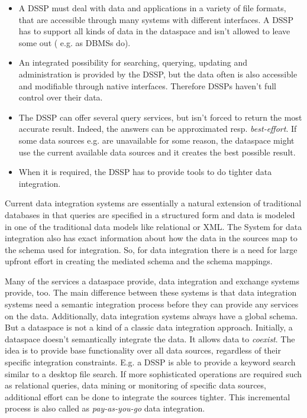 \begin{itemize}
\item A DSSP must deal with data and applications in a variety of file formats, that are accessible through many systems with different interfaces. A DSSP has to support all kinds of data in the dataspace and isn't allowed to leave some out ( e.g. as DBMSs do).

\item An integrated possibility for searching, querying, updating and administration is provided by the DSSP, but the data often is also accessible and modifiable through native interfaces. Therefore DSSPs haven't full control over their data.

\item The DSSP can offer several query services, but isn't forced to return the most accurate result. Indeed,  the answers can be approximated resp. \emph{best-effort}. If some data sources e.g. are unavailable for some reason, the dataspace might use the current available data sources and
it creates the best possible result.

\item When it is required, the DSSP has to provide tools to do tighter data integration.
\end{itemize}

Current data integration systems are essentially a natural extension of traditional databases in that queries are specified in a structured form and data is modeled in one of the traditional data models like relational or XML. The System for data integration also has exact information about how the data in the sources map to the schema used for integration. So, for data integration there is a need for large upfront effort in creating the mediated schema and the schema mappings.

Many of the services a dataspace provide, data integration and exchange systems provide, too. The main difference between these systems is that data integration systems need a semantic integration process before they can provide any services on the data. Additionally, data integration systems always have a global schema. But a dataspace is not a kind of a classic data integration approach. Initially, a dataspace doesn't semantically integrate the data. It allows data to \emph{coexist}.  The idea is to provide base functionality over all data sources, regardless of their specific integration constraints. E.g. a DSSP is able to provide a keyword search similar to a desktop file search. If more sophisticated operations are required such as relational queries, data mining or monitoring of specific data sources, additional effort can be done to integrate the sources tighter. This incremental process is also called as \emph{pay-as-you-go} data integration.


